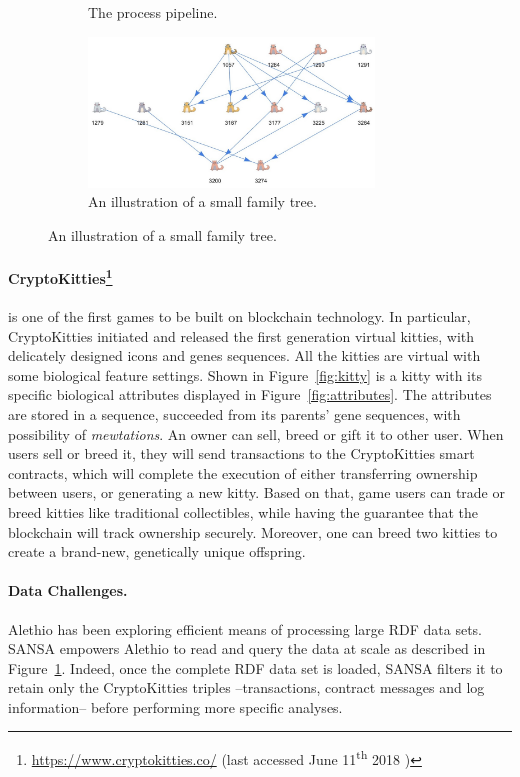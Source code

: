\begin{figure}[t]
\begin{subfigure}[b]{0.5\textwidth}
\caption{The process pipeline.}
\label{fig:pipeline}
\end{subfigure}
\begin{subfigure}[b]{0.5\textwidth}
\centering
\includegraphics[height=4cm,width=\textwidth]{images/7_implemenation_and_usecases/incest-crop.jpeg}
\caption{An illustration of a small family tree.}
\label{fig:incest}
\end{subfigure}
\end{figure}

\paragraph*{CryptoKitties\footnote{\url{https://www.cryptokitties.co/} (last accessed June 11\textsuperscript{th} 2018 )}} is one of the first games to be built on blockchain technology. In particular, CryptoKitties initiated and released the first generation virtual kitties, with delicately designed icons and genes sequences. All the kitties are virtual with some biological feature settings. 
Shown in Figure~\ref{fig:kitty} is a kitty with its specific biological attributes displayed in Figure~\ref{fig:attributes}. The attributes are stored in a sequence, succeeded from its parents' gene sequences, with possibility of \textit{mewtations}.
An owner can sell, breed or gift it to other user. When users sell or breed it, they will send transactions to the CryptoKitties smart contracts, which will complete the execution of either transferring ownership between users, or generating a new kitty.
Based on that, game users can trade or breed kitties like traditional collectibles, while having the guarantee that the blockchain will track ownership securely. Moreover, one can breed two kitties to create a brand-new, genetically unique offspring.

\paragraph*{Data Challenges.}
Alethio has been exploring efficient means of processing large RDF data sets. SANSA empowers Alethio to read and query the data at scale as described in Figure~\ref{fig:pipeline}. Indeed, once the complete RDF data set is loaded, SANSA filters it to retain only the CryptoKitties triples --transactions, contract messages and log information-- before performing more specific analyses.

